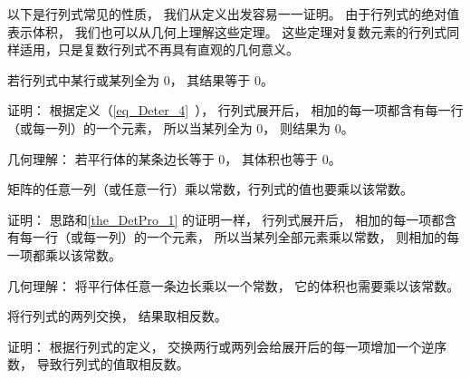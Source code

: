 


以下是行列式常见的性质， 我们从定义出发容易一一证明。 由于行列式的绝对值表示体积， 我们也可以从几何上理解这些定理。 这些定理对复数元素的行列式同样适用，只是复数行列式不再具有直观的几何意义。

\begin{theorem}{ } \label{the_DetPro_1}
若行列式中某行或某列全为 0， 其结果等于 0。
\end{theorem}
证明： 根据定义（\autoref{eq_Deter_4}~）， 行列式展开后， 相加的每一项都含有每一行（或每一列）的一个元素， 所以当某列全为 0， 则结果为 0。

几何理解： 若平行体的某条边长等于 0， 其体积也等于 0。

\begin{theorem}{ } \label{the_DetPro_3}
矩阵的任意一列（或任意一行）乘以常数，行列式的值也要乘以该常数。
\end{theorem}
证明： 思路和\autoref{the_DetPro_1} 的证明一样， 行列式展开后， 相加的每一项都含有每一行（或每一列）的一个元素， 所以当某列全部元素乘以常数， 则相加的每一项都乘以该常数。

几何理解： 将平行体任意一条边长乘以一个常数， 它的体积也需要乘以该常数。

\begin{theorem}{ }\label{the_DetPro_6}
将行列式的两列交换， 结果取相反数。
\end{theorem}
证明： 根据行列式的定义， 交换两行或两列会给展开后的每一项增加一个逆序数， 导致行列式的值取相反数。

